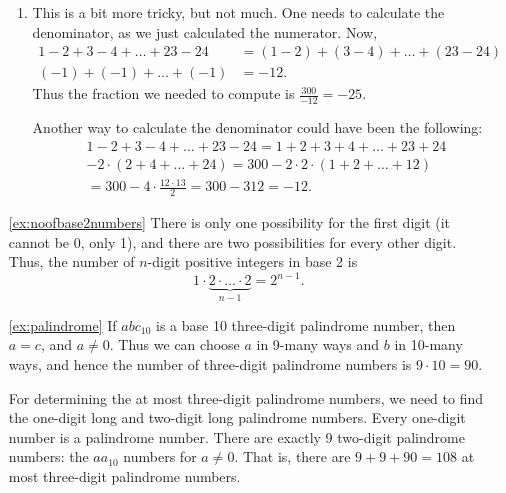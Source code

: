 \begin{enumerate}
\begin{enumerate}
\item%
This is a bit more tricky, %
but not much. 
One needs to calculate the denominator, as we just calculated the numerator. 
Now, 
\begin{align*}
1-2+3-4+ \dots + 23-24 &= (1-2) + (3-4) + \dots + (23-24) \\
(-1) + (-1) + \dots + (-1) &= -12. 
\end{align*}
Thus the fraction we needed to compute is $\frac{300}{-12} = -25$. 

Another way to calculate the denominator could have been the following: 
\begin{align*}
&1-2+3-4+ \dots + 23-24 = 1+2 + 3+4 + \dots + 23+24 \\
&- 2 \cdot (2 + 4 + \dots + 24) = 300 - 2 \cdot 2 \cdot (1 + 2 + \dots + 12) \\
&= 300 - 4 \cdot \frac{12\cdot 13}{2} = 300- 312 = -12. 
\end{align*}
\end{enumerate}

%

\item[\ref{ex:noofbase2numbers}]
There is only one possibility for the first digit (it cannot be 0, only 1), 
and there are two possibilities for every other digit. 
Thus, the number of $n$-digit positive integers in base 2 is
\[
1 \cdot \underbrace{2 \cdot \dots \cdot 2}_{n-1} = 2^{n-1}. 
\]


\item[\ref{ex:palindrome}]
If $abc_{10}$ is a base 10 three-digit palindrome number, 
then $a = c$, and $a \neq 0$. 
Thus we can choose $a$ in 9-many ways and $b$ in 10-many ways, 
and hence the number of three-digit palindrome numbers is $9 \cdot 10 = 90$. 

For determining the at most three-digit palindrome numbers, 
we need to find the one-digit long and two-digit long palindrome numbers. 
Every one-digit number is a palindrome number. 
There are exactly 9 two-digit palindrome numbers: 
the $aa_{10}$ numbers for $a\neq 0$. 
That is, 
there are $9+9+90=108$ at most three-digit palindrome numbers. 


\end{enumerate}
